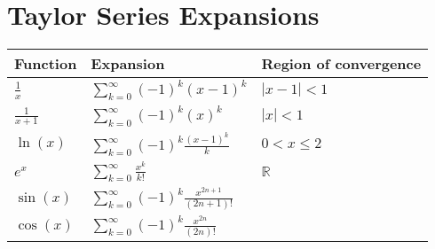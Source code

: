 \documentclass{article}
\begin{document}
\section{Taylor Series Expansions}
\begin{table}[h]
	\centering
	\begin{tabularx}{0.75\textwidth}{ X X X }
		Function & Expansion & Region of convergence \\
		\hline
		$\frac{1}{x}$ & $\sum_{k=0}^{\infty} (-1)^{k}(x - 1)^{k}$ & $|x - 1| < 1$ \\
		$\frac{1}{x + 1}$ & $\sum_{k=0}^{\infty} (-1)^{k}(x)^{k}$ & $|x| < 1$ \\
		$\ln(x)$ & $\sum_{k=0}^{\infty}(-1)^{k}\frac{(x - 1)^{k}}{k}$ & $0 < x \leq 2$ \\
		$e^x$ & $\sum_{k=0}^{\infty}\frac{x^k}{k!}$ & $\mathbb{R}$ \\
		$\sin(x)$ & $\sum_{k=0}^{\infty} (-1)^{k}\frac{x^{2n + 1}}{(2n + 1)!}$ & \\
		$\cos(x)$ & $\sum_{k=0}^{\infty} (-1)^{k}\frac{x^{2n}}{(2n)!}$ & \\
	\end{tabularx}
\end{table}
\end{document}
